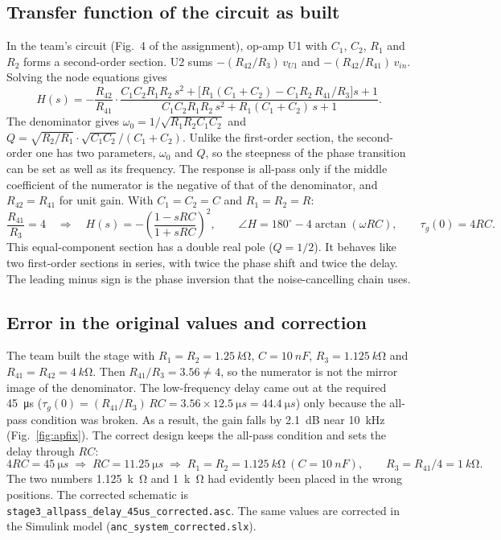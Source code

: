 \subsection{Transfer function of the circuit as built}
In the team's circuit (Fig.~4 of the assignment), op-amp U1 with $C_1$, $C_2$, $R_1$ and $R_2$ forms a
second-order section. U2 sums $-(R_{42}/R_3)\,v_{U1}$ and $-(R_{42}/R_{41})\,v_{in}$. Solving the node equations gives
\[
H(s) = -\frac{R_{42}}{R_{41}}\cdot
\frac{C_1C_2R_1R_2\,s^2 + \big[R_1(C_1+C_2) - C_1R_2\,R_{41}/R_3\big]s + 1}
     {C_1C_2R_1R_2\,s^2 + R_1(C_1+C_2)\,s + 1}.
\]
The denominator gives $\omega_0 = 1/\sqrt{R_1R_2C_1C_2}$ and $Q = \sqrt{R_2/R_1}\cdot\sqrt{C_1C_2}/(C_1+C_2)$.
Unlike the first-order section, the second-order one has two parameters, $\omega_0$ and $Q$, so the steepness of the phase transition can be set as well as its frequency.
The response is all-pass only if the middle coefficient of the numerator is the negative of
that of the denominator, and $R_{42}=R_{41}$ for unit gain. With $C_1=C_2=C$ and $R_1=R_2=R$:
\[
\frac{R_{41}}{R_3} = 4 \quad\Longrightarrow\quad H(s) = -\left(\frac{1 - sRC}{1 + sRC}\right)^2,\qquad
\angle H = 180^\circ - 4\arctan(\omega RC),\qquad \tau_g(0) = 4RC.
\]
This equal-component section has a double real pole ($Q = 1/2$). It behaves like two first-order sections in series, with twice the phase shift and twice the delay. The leading minus sign is the phase inversion that the noise-cancelling chain uses.

\subsection{Error in the original values and correction}
The team built the stage with $R_1=R_2=\SI{1.25}{k\ohm}$, $C=\SI{10}{nF}$, $R_3=\SI{1.125}{k\ohm}$ and
$R_{41}=R_{42}=\SI{4}{k\ohm}$. Then $R_{41}/R_3 = 3.56 \neq 4$, so the numerator is not the mirror
image of the denominator. The low-frequency delay came out at the required \SI{45}{\micro s}
($\tau_g(0) = (R_{41}/R_3)\,RC = 3.56 \times \SI{12.5}{\micro s} = \SI{44.4}{\micro s}$) only because the all-pass condition was broken. As a result, the gain falls by \SI{2.1}{dB} near
\SI{10}{kHz} (Fig.~\ref{fig:apfix}). The correct design keeps the all-pass condition and sets the delay through $RC$:
\[
4RC = \SI{45}{\micro s} \;\Rightarrow\; RC = \SI{11.25}{\micro s} \;\Rightarrow\;
R_1 = R_2 = \SI{1.125}{k\ohm}\ (C = \SI{10}{nF}),\qquad R_3 = R_{41}/4 = \SI{1}{k\ohm}.
\]
The two numbers \SI{1.125}{k\ohm} and \SI{1}{k\ohm} had evidently been placed in the wrong positions. The corrected
schematic is \texttt{stage3\_allpass\_delay\_45us\_corrected.asc}. The same values are corrected in the
Simulink model (\texttt{anc\_system\_corrected.slx}).

